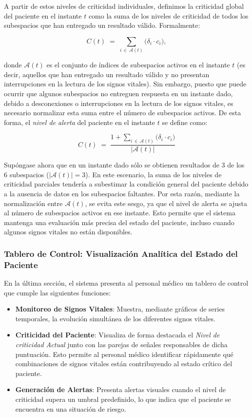 A partir de estos niveles de criticidad individuales, definimos la criticidad global del paciente en el instante $t$ como la suma de los niveles de criticidad de todos los subespacios que han entregado un resultado válido. Formalmente:

\[
  C(t) \;=\; \sum_{i \,\in\, \mathcal{A}(t)} \bigl(\delta_i \cdot c_i \bigr),
\]

donde $\mathcal{A}(t)$ es el conjunto de índices de subespacios activos en el instante $t$ (es decir, aquellos que han entregado un resultado válido y no presentan interrupciones en la lectura de los signos vitales). Sin embargo, puesto que puede ocurrir que algunos subespacios no entreguen respuesta en un instante dado, debido a desconexiones o interrupciones en la lectura de los signos vitales, es necesario normalizar esta suma entre el número de subespacios activos. De esta forma, el \emph{nivel de alerta} del paciente en el instante $t$ se define como:

\[
  C(t)
  \;=\;
  \frac{
    1 + \displaystyle\sum_{i \,\in\, \mathcal{A}(t)} \bigl(\delta_i \cdot c_i \bigr)
  }{
    \bigl|\mathcal{A}(t)\bigr|
  }
\]

Supóngase ahora que en un instante dado sólo se obtienen resultados de 3 de los 6 subespacios ($|\mathcal{A}(t)| = 3$). En este escenario, la suma de los niveles de criticidad parciales tendería a subestimar la condición general del paciente debido a la ausencia de datos en los subespacios faltantes. Por esta razón, mediante la normalización entre $\mathcal{A}(t)$, se evita este sesgo, ya que el nivel de alerta se ajusta al número de subespacios activos en ese instante. Esto permite que el sistema mantenga una evaluación más precisa del estado del paciente, incluso cuando algunos signos vitales no están disponibles.

\bigskip

\subsubsection*{Tablero de Control: Visualización Analítica del Estado del Paciente}

En la última sección, el sistema presenta al personal médico un tablero de control que cumple las siguientes funciones:

\begin{itemize}
  \item \textbf{Monitoreo de Signos Vitales}: Muestra, mediante gráficos de series temporales, la evolución simultánea de los diferentes signos vitales.
  \item \textbf{Criticidad del Paciente}: Visualiza de forma destacada el \emph{Nivel de criticidad Actual} junto con las parejas de señales responsables de dicha puntuación. Esto permite al personal médico identificar rápidamente qué combinaciones de signos vitales están contribuyendo al estado crítico del paciente.
  \item \textbf{Generación de Alertas}: Presenta alertas visuales cuando el nivel de criticidad supera un umbral predefinido, lo que indica que el paciente se encuentra en una situación de riesgo.
\end{itemize}

